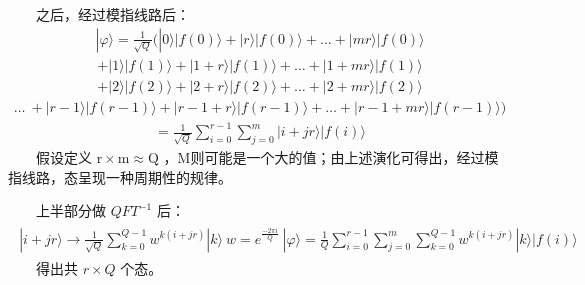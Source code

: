 \documentclass[a4paper,11pt,english]{sphinxmanual}
\begin{document}
\sphinxAtStartPar
  之后，经过模指线路后：
\begin{equation*}
\begin{split}|\varphi\rangle=\frac{1}{\sqrt{Q}}(|0\rangle|f(0)\rangle+|r\rangle|f(0)\rangle+\ldots+|m r\rangle|f(0)\rangle\end{split}
\end{equation*}\begin{equation*}
\begin{split}+|1\rangle|f(1)\rangle+|1+r\rangle|f(1)\rangle+\ldots+|1+m r\rangle|f(1)\rangle\end{split}
\end{equation*}\begin{equation*}
\begin{split}+|2\rangle|f(2)\rangle+|2+r\rangle|f(2)\rangle+\ldots+|2+m r\rangle|f(2)\rangle\end{split}
\end{equation*}\begin{equation*}
\begin{split}\ldots \ +|r-1\rangle|f(r-1)\rangle+|r-1+r\rangle|f(r-1)\rangle+\ldots+|r-1+m r\rangle|f(r-1)\rangle)\end{split}
\end{equation*}\begin{equation*}
\begin{split}=\frac{1}{\sqrt{Q}} \sum_{i=0}^{r-1} \sum_{j=0}^{m}|i+j r\rangle|f(i)\rangle\end{split}
\end{equation*}
\sphinxAtStartPar
  假设定义 \(\mathrm{r} \times \mathrm{m} \approx \mathrm{Q}\) ，M则可能是一个大的值；由上述演化可得出，经过模指线路，态呈现一种周期性的规律。

\sphinxAtStartPar
  上半部分做 \(Q F T^{-1}\) 后：
\begin{equation*}
\begin{split}\begin{array}{c} |i+j r\rangle \rightarrow \frac{1}{\sqrt{Q}} \sum_{k=0}^{Q-1} w^{k(i+j r)}|k\rangle \ w=e^{\frac{-2 \pi{i}}{Q}} \ |\varphi\rangle=\frac{1}{Q} \sum_{i=0}^{r-1} \sum_{j=0}^{m} \sum_{k=0}^{Q-1} w^{k(i+j r)}|k\rangle|f(i)\rangle \end{array}\end{split}
\end{equation*}
\sphinxAtStartPar
  得出共  \(r \times Q\) 个态。
\end{document}
